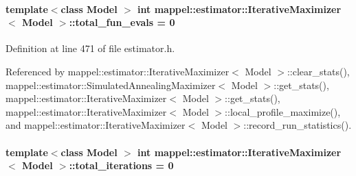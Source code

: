 \paragraph[{\texorpdfstring{total\+\_\+fun\+\_\+evals}{total_fun_evals}}]{\setlength{\rightskip}{0pt plus 5cm}template$<$class Model $>$ int {\bf mappel\+::estimator\+::\+Iterative\+Maximizer}$<$ Model $>$\+::total\+\_\+fun\+\_\+evals = 0\hspace{0.3cm}{\ttfamily [protected]}}\hypertarget{classmappel_1_1estimator_1_1IterativeMaximizer_aa4f49112ff3b145fa1096a7ac4d48af7}{}\label{classmappel_1_1estimator_1_1IterativeMaximizer_aa4f49112ff3b145fa1096a7ac4d48af7}


Definition at line 471 of file estimator.\+h.



Referenced by mappel\+::estimator\+::\+Iterative\+Maximizer$<$ Model $>$\+::clear\+\_\+stats(), mappel\+::estimator\+::\+Simulated\+Annealing\+Maximizer$<$ Model $>$\+::get\+\_\+stats(), mappel\+::estimator\+::\+Iterative\+Maximizer$<$ Model $>$\+::get\+\_\+stats(), mappel\+::estimator\+::\+Iterative\+Maximizer$<$ Model $>$\+::local\+\_\+profile\+\_\+maximize(), and mappel\+::estimator\+::\+Iterative\+Maximizer$<$ Model $>$\+::record\+\_\+run\+\_\+statistics().

\paragraph[{\texorpdfstring{total\+\_\+iterations}{total_iterations}}]{\setlength{\rightskip}{0pt plus 5cm}template$<$class Model $>$ int {\bf mappel\+::estimator\+::\+Iterative\+Maximizer}$<$ Model $>$\+::total\+\_\+iterations = 0\hspace{0.3cm}{\ttfamily [protected]}}\hypertarget{classmappel_1_1estimator_1_1IterativeMaximizer_a14a3683e595e1db79b9cbc49b0d8688e}{}\label{classmappel_1_1estimator_1_1IterativeMaximizer_a14a3683e595e1db79b9cbc49b0d8688e}


